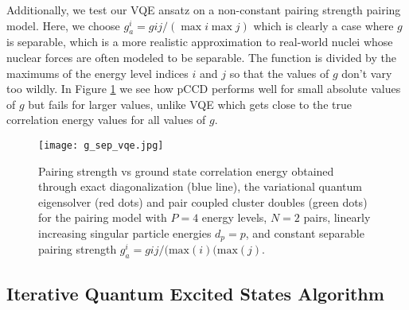 \documentclass[10pt]{article}
\begin{document}


Additionally, we test our VQE ansatz on a non-constant pairing strength pairing model. Here, we choose $g^i_a=gij/(\max{i}\max{j})$ which is clearly a case where $g$ is separable, which is a more realistic approximation to real-world nuclei whose nuclear forces are often modeled to be separable. The function is divided by the maximums of the energy level indices $i$ and $j$ so that the values of $g$ don't vary too wildly. In Figure \ref{fig:g_sep_vqe} we see how pCCD performs well for small absolute values of $g$ but fails for larger values, unlike VQE which gets close to the true correlation energy values for all values of $g$.

\begin{figure}[t]
    \centering
    \texttt{[image: g\_sep\_vqe.jpg]}
    \caption
    {Pairing strength vs ground state correlation energy obtained through exact diagonalization (blue line), the variational quantum eigensolver (red dots) and pair coupled cluster doubles (green dots) for the pairing model with $P=4$ energy levels, $N=2$ pairs, linearly increasing singular particle energies $d_p=p$, and constant separable pairing strength $g^i_a=gij/(\text{max}(i)(\text{max}(j)$.}
    \label{fig:g_sep_vqe}
\end{figure}

\subsection{Iterative Quantum Excited States Algorithm}
\end{document}
